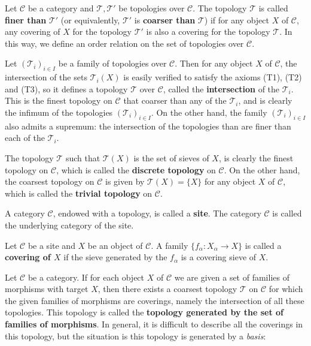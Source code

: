 Let $\mathcal{C}$ be a category and $\mathcal{T},\mathcal{T}'$ be topologies over $\mathcal{C}$. The topology $\mathcal{T}$ is called \textbf{finer than} $\mathcal{T}'$ (or equivalently, $\mathcal{T}'$ is \textbf{coarser than} $\mathcal{T}$) if for any object $X$ of $\mathcal{C}$, any covering of $X$ for the topology $\mathcal{T}'$ is also a covering for the topology $\mathcal{T}$. In this way, we define an order relation on the set of topologies over $\mathcal{C}$.
\begin{example}\label{G-topo intersection and union}
Let $(\mathcal{T}_i)_{i\in I}$ be a family of topologies over $\mathcal{C}$. Then for any object $X$ of $\mathcal{C}$, the intersection of the sets $\mathcal{T}_i(X)$ is easily verified to satisfy the axioms (T1), (T2) and (T3), so it defines a topology $\mathcal{T}$ over $\mathcal{C}$, called the \textbf{intersection} of the $\mathcal{T}_i$. This is the finest topology on $\mathcal{C}$ that coarser than any of the $\mathcal{T}_i$, and is clearly the infimum of the topologies $(\mathcal{T}_i)_{i\in I}$. On the other hand, the family $(\mathcal{T}_i)_{i\in I}$ also admits a supremum: the intersection of the topologies than are finer than each of the $\mathcal{T}_i$.
\end{example}
\begin{example}\label{G-topo discrete}
The topology $\mathcal{T}$ such that $\mathcal{T}(X)$ is the set of sieves of $X$, is clearly the finest topology on $\mathcal{C}$, which is called the \textbf{discrete topology} on $\mathcal{C}$. On the other hand, the coarsest topology on $\mathcal{C}$ is given by $\mathcal{T}(X)=\{X\}$ for any object $X$ of $\mathcal{C}$, which is called the \textbf{trivial topology} on $\mathcal{C}$.
\end{example}
A category $\mathcal{C}$, endowed with a topology, is called a \textbf{site}. The category $\mathcal{C}$ is called the underlying category of the site.
\begin{definition}
Let $\mathcal{C}$ be a site and $X$ be an object of $\mathcal{C}$. A family $\{f_\alpha:X_\alpha\to X\}$ is called a \textbf{covering of $X$} if the sieve generated by the $f_\alpha$ is a covering sieve of $X$.
\end{definition}
Let $\mathcal{C}$ be a category. If for each object $X$ of $\mathcal{C}$ we are given a set of families of morphisms with target $X$, then there exists a coarsest topology $\mathcal{T}$ on $\mathcal{C}$ for which the given families of morphisms are coverings, namely the intersection of all these topologies. This topology is called the \textbf{topology generated by the set of families of morphisms}. In general, it is difficult to describe all the coverings in this topology, but the situation is this topology is generated by a \textit{basis}:
